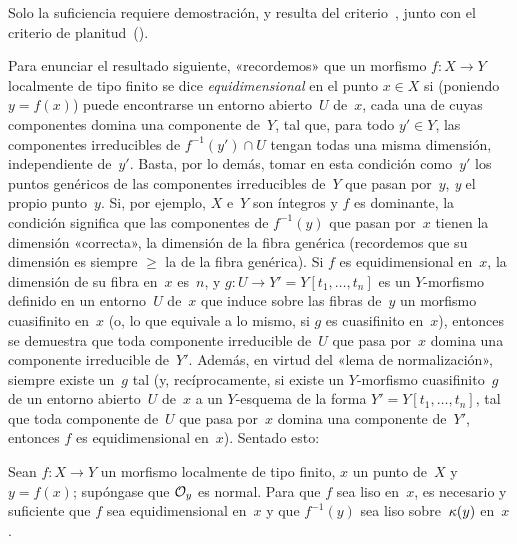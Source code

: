 Solo la suficiencia requiere demostración, y resulta del criterio~, junto con el criterio de planitud~().

Para
enunciar el resultado siguiente, «recordemos» que un morfismo $f\colon X\to Y$ localmente de tipo finito se dice \emph{equidimensional}
%
en el punto $x\in X$ si (poniendo $y=f(x)$) puede encontrarse un entorno abierto~$U$ de~$x$, cada una de cuyas componentes domina una componente de~$Y$, tal que, para todo $y'\in Y$, las componentes irreducibles de $f^{-1}(y')\cap U$ tengan todas una misma dimensión, independiente de~$y'$. Basta, por lo demás, tomar en esta condición como~$y'$ los puntos genéricos de las componentes irreducibles de~$Y$ que pasan por~$y$, \emph{y} el propio punto~$y$. Si, por ejemplo, $X$ e~$Y$ son íntegros y $f$ es dominante, la condición significa que las componentes de $f^{-1}(y)$ que pasan por~$x$ tienen la dimensión «correcta», \ie la dimensión de la fibra genérica (recordemos que su dimensión es siempre $\geq$ la de la fibra genérica). Si $f$ es equidimensional en~$x$, la dimensión de su fibra en~$x$ es~$n$, y $g\colon U\to Y'=Y[t_1,\dots,t_n]$ es un $Y$-morfismo definido en un entorno~$U$ de~$x$ que induce sobre las fibras de~$y$ un morfismo cuasifinito en~$x$ (o, lo que equivale a lo mismo, si $g$ es cuasifinito en~$x$), entonces se demuestra que toda componente irreducible de~$U$ que pasa por~$x$ domina una componente irreducible de~$Y'$. Además, en virtud del «lema de normalización», siempre existe un~$g$ tal (y, recíprocamente, si existe un $Y$-morfismo cuasifinito~$g$ de un entorno abierto~$U$ de~$x$ a un $Y$-esquema de la forma $Y'=Y[t_1,\dots,t_n]$, tal que toda componente de~$U$ que pasa por~$x$ domina una componente de~$Y'$, entonces $f$ es equidimensional en~$x$). Sentado esto:

\begin{proposition}
\label{II.2.3}
Sean $f\colon X\to Y$ un morfismo localmente de tipo finito, $x$ un punto de~$X$ y $y=f(x)$; supóngase que $\cal{O}_y$ es normal. Para que $f$ sea liso en~$x$, es necesario y suficiente que $f$ sea equidimensional en~$x$ y que $f^{-1}(y)$ sea liso sobre~$\kres(y)$ en~$x$.
\end{proposition}

